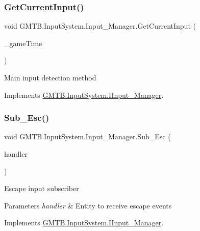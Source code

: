 \subsubsection{\texorpdfstring{GetCurrentInput()}{GetCurrentInput()}}
{\footnotesize\ttfamily void G\+M\+T\+B.\+Input\+System.\+Input\+\_\+\+Manager.\+Get\+Current\+Input (\begin{DoxyParamCaption}\item[{Game\+Time}]{\+\_\+game\+Time }\end{DoxyParamCaption})}



Main input detection method 



Implements \mbox{\hyperlink{interface_g_m_t_b_1_1_input_system_1_1_i_input___manager_ac18c8364400155f82270785e1c5afd72}{G\+M\+T\+B.\+Input\+System.\+I\+Input\+\_\+\+Manager}}.

\mbox{\label{class_g_m_t_b_1_1_input_system_1_1_input___manager_adf40d6cb8cb0df480fe10675ba230786}} 
\subsubsection{\texorpdfstring{Sub\_Esc()}{Sub\_Esc()}}
{\footnotesize\ttfamily void G\+M\+T\+B.\+Input\+System.\+Input\+\_\+\+Manager.\+Sub\+\_\+\+Esc (\begin{DoxyParamCaption}\item[{Event\+Handler$<$ \mbox{\hyperlink{class_g_m_t_b_1_1_input_system_1_1_input_event}{Input\+Event}} $>$}]{handler }\end{DoxyParamCaption})}



Escape input subscriber 


\begin{DoxyParams}{Parameters}
{\em handler} & Entity to receive escape events\\
\hline
\end{DoxyParams}


Implements \mbox{\hyperlink{interface_g_m_t_b_1_1_input_system_1_1_i_input___manager_adf096b62c4736d95efdc9ce6a7f3d219}{G\+M\+T\+B.\+Input\+System.\+I\+Input\+\_\+\+Manager}}.

\mbox{\label{class_g_m_t_b_1_1_input_system_1_1_input___manager_a44403aa4e08bb3e60e030689b8d178f6}} 
